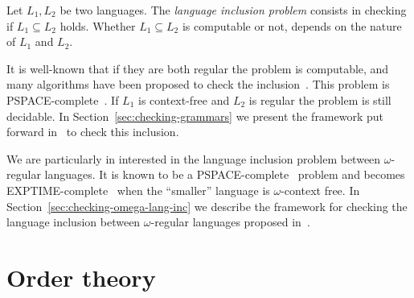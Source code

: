 Let $L_1, L_2$ be two languages.
The \emph{language inclusion problem} consists in checking if $L_1 \subseteq L_2$
holds.
Whether $L_1 \subseteq L_2$ is computable or not, depends on the nature
of $L_1$ and $L_2$.

It is well-known that if they are both regular the problem is computable,
and many algorithms have been proposed to check the
inclusion~\cite{ganty2019language, de2006antichains, abdulla2010simulation}.
This problem is PSPACE-complete~\cite{abdulla2010simulation}.
If $L_1$ is context-free and $L_2$ is regular the problem is still decidable.
In Section~\ref{sec:checking-grammars} we present the framework put forward in~\cite{ganty2019language}
to check this inclusion.

We are particularly in interested in the language inclusion problem
between $\omega$-regular languages.
It is known to be a PSPACE-complete~\cite{kupferman1996verification} problem and becomes
EXPTIME-complete~\cite{meyer2017liveness} when the ``smaller''
language is $\omega$-context free.
In Section~\ref{sec:checking-omega-lang-inc} we describe the framework
for checking the language inclusion between $\omega$-regular languages
proposed in~\cite{ganty2020omegalang}.

\section{Order theory}
\label{sec:order-theory}

